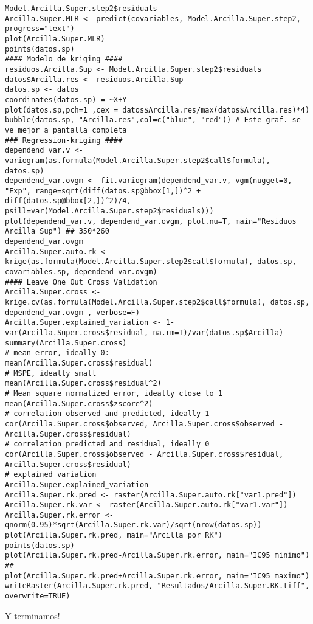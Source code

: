 \documentclass[10pt,a4paper]{article}
\begin{document}
\begin{lstlisting}
Model.Arcilla.Super.step2$residuals
Arcilla.Super.MLR <- predict(covariables, Model.Arcilla.Super.step2, progress="text")
plot(Arcilla.Super.MLR)
points(datos.sp)
#### Modelo de kriging ####
residuos.Arcilla.Sup <- Model.Arcilla.Super.step2$residuals
datos$Arcilla.res <- residuos.Arcilla.Sup
datos.sp <- datos
coordinates(datos.sp) = ~X+Y
plot(datos.sp,pch=1 ,cex = datos$Arcilla.res/max(datos$Arcilla.res)*4)
bubble(datos.sp, "Arcilla.res",col=c("blue", "red")) # Este graf. se ve mejor a pantalla completa
### Regression-kriging ####
dependend_var.v <- variogram(as.formula(Model.Arcilla.Super.step2$call$formula), datos.sp)
dependend_var.ovgm <- fit.variogram(dependend_var.v, vgm(nugget=0, "Exp", range=sqrt(diff(datos.sp@bbox[1,])^2 + diff(datos.sp@bbox[2,])^2)/4, psill=var(Model.Arcilla.Super.step2$residuals)))
plot(dependend_var.v, dependend_var.ovgm, plot.nu=T, main="Residuos Arcilla Sup") ## 350*260
dependend_var.ovgm
Arcilla.Super.auto.rk <- krige(as.formula(Model.Arcilla.Super.step2$call$formula), datos.sp, covariables.sp, dependend_var.ovgm)
#### Leave One Out Cross Validation
Arcilla.Super.cross <- krige.cv(as.formula(Model.Arcilla.Super.step2$call$formula), datos.sp, dependend_var.ovgm , verbose=F)
Arcilla.Super.explained_variation <- 1-var(Arcilla.Super.cross$residual, na.rm=T)/var(datos.sp$Arcilla)
summary(Arcilla.Super.cross)
# mean error, ideally 0:
mean(Arcilla.Super.cross$residual)
# MSPE, ideally small
mean(Arcilla.Super.cross$residual^2)
# Mean square normalized error, ideally close to 1
mean(Arcilla.Super.cross$zscore^2)
# correlation observed and predicted, ideally 1
cor(Arcilla.Super.cross$observed, Arcilla.Super.cross$observed - Arcilla.Super.cross$residual)
# correlation predicted and residual, ideally 0
cor(Arcilla.Super.cross$observed - Arcilla.Super.cross$residual, Arcilla.Super.cross$residual)
# explained variation
Arcilla.Super.explained_variation
Arcilla.Super.rk.pred <- raster(Arcilla.Super.auto.rk["var1.pred"])
Arcilla.Super.rk.var <- raster(Arcilla.Super.auto.rk["var1.var"])
Arcilla.Super.rk.error <- qnorm(0.95)*sqrt(Arcilla.Super.rk.var)/sqrt(nrow(datos.sp))
plot(Arcilla.Super.rk.pred, main="Arcilla por RK")
points(datos.sp)
plot(Arcilla.Super.rk.pred-Arcilla.Super.rk.error, main="IC95 minimo") ## 
plot(Arcilla.Super.rk.pred+Arcilla.Super.rk.error, main="IC95 maximo")
writeRaster(Arcilla.Super.rk.pred, "Resultados/Arcilla.Super.RK.tiff", overwrite=TRUE)
\end{lstlisting}

Y terminamos!
  

\end{document}
